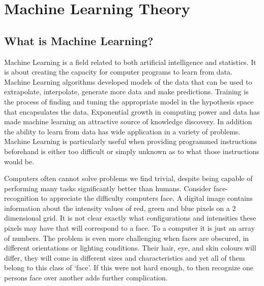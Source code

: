 
\chapter{Machine Learning Theory} %

\label{Chapter1} %



\section{What is Machine Learning?}
Machine Learning is a field related to both artificial intelligence and statistics.
It is about creating the capacity for computer programs to learn from data.
Machine Learning algorithms developed models of the data that can be used to extrapolate, interpolate, generate more data and make predictions.
Training is the process of finding and tuning the appropriate model in the hypothesis space that encapsulates the data.
Exponential growth in computing power and data has made machine learning an attractive source of knowledge discovery.
In addition the ability to learn from data has wide application in a variety of problems.
Machine Learning is particularly useful when providing programmed instructions beforehand is either too difficult or simply unknown as to what those instructions would be.

Computers often cannot solve problems we find trivial, despite being capable of performing many tasks significantly better than humans.
Consider face-recognition to appreciate the difficulty computers face.
A digital image contains information about the intensity values of red, green and blue pixels on a 2 dimensional grid.
It is not clear exactly what configurations and intensities these pixels may have that will correspond to a face.
To a computer it is just an array of numbers.
The problem is even more challenging when faces are obscured, in different orientations or lighting conditions.
Their hair, eye, and skin colours will differ, they will come in different sizes and characteristics and yet all of them belong to this class of `face'.
If this were not hard enough, to then recognize one persons face over another adds further complication.


